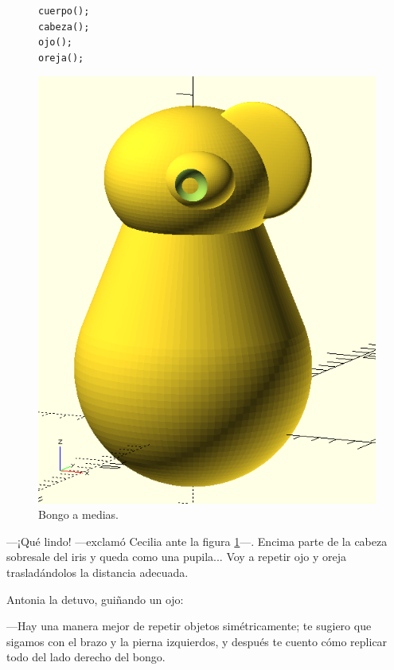   \begin{figure}[ht]
      \begin{minipage}[]{.5\textwidth}
\begin{lstlisting}
cuerpo();
cabeza();
ojo();
oreja();
\end{lstlisting}
\end{minipage}
  \begin{minipage}[]{.4\textwidth}
  \centering
  \includegraphics[width=\textwidth]{imagenes/bongo-a-medias}
\end{minipage}
\caption{Bongo a medias.}
  \label{fig:bongo-a-medias}
\end{figure}


---¡Qué lindo! ---exclamó Cecilia ante la figura
\ref{fig:bongo-a-medias}---. Encima parte de la cabeza sobresale del iris
y queda como una pupila... Voy a repetir ojo y oreja trasladándolos la
distancia adecuada.
    
Antonia la detuvo, guiñando un ojo:

---Hay una manera mejor de repetir objetos simétricamente; te sugiero
que sigamos con el brazo y la pierna izquierdos, y después te cuento
cómo replicar todo del lado derecho del bongo.


